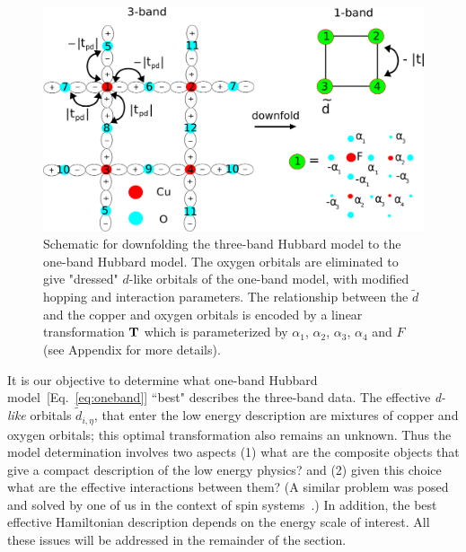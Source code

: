 \begin{figure}
\centering
\includegraphics[width=0.9\linewidth]{./Figures/three_band_figure.eps}
\caption{Schematic for downfolding the three-band Hubbard model to the one-band Hubbard model. The oxygen orbitals are 
eliminated to give "dressed" $d$-like orbitals of the one-band model, with modified hopping and interaction parameters. 
The relationship between the $\tilde{d}$ and the copper and oxygen orbitals is encoded by a linear transformation 
${\bf T}$ which is parameterized by $\alpha_1$, $\alpha_2$, $\alpha_3$, $\alpha_4$ and $F$ (see Appendix for more details).}
\label{fig:threeband} 
\end{figure}

It is our objective to determine what one-band Hubbard model~[Eq.~\eqref{eq:oneband}]
``best" describes the three-band data. The effective \textit{d-like} orbitals $\tilde{d}_{i,\eta}$, 
that enter the low energy description are mixtures of copper and oxygen orbitals; this optimal transformation also remains an unknown. 
Thus the model determination involves two aspects (1) what are the composite objects that give a 
compact description of the low energy physics? and (2) given this choice what are the effective interactions between them? 
(A similar problem was posed and solved by one of us in the context of spin systems~\cite{Changlani_percolation}.)
In addition, the best effective Hamiltonian description depends on the energy scale of interest. 
All these issues will be addressed in the remainder of the section. 

